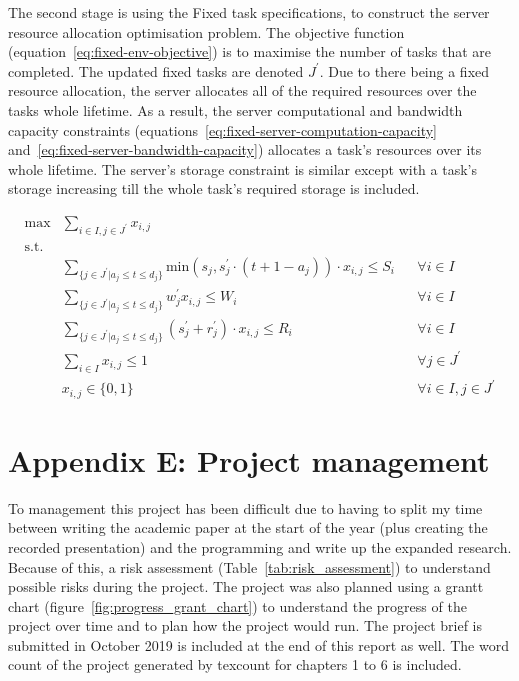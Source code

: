 The second stage is using the Fixed task specifications, to construct the server resource allocation optimisation
problem. The objective function (equation~\ref{eq:fixed-env-objective}) is to maximise the number of tasks that are
completed. The updated fixed tasks are denoted $J^{'}$. Due to there being a fixed resource allocation, the server
allocates all of the required resources over the tasks whole lifetime. As a result, the server computational and
bandwidth capacity constraints (equations~\ref{eq:fixed-server-computation-capacity}
and~\ref{eq:fixed-server-bandwidth-capacity}) allocates a task's resources over its whole lifetime. The server's storage
constraint is similar except with a task's storage increasing till the whole task's required storage is included.

\begin{align}
    \text{max} & \sum_{i \in I, j \in J^{'}} x_{i,j} \label{eq:fixed-env-objective} \\
    \mbox{s.t.} \nonumber \\
    & \sum_{\{j \in J^{'} | a_j \leq t \leq d_j\}} \text{min}(s_j, s^{'}_j \cdot (t + 1 - a_j)) \cdot x_{i,j} \leq S_i && \forall{i \in I} \label{eq:fixed-server-storage-capacity} \\
    & \sum_{\{j \in J^{'} | a_j \leq t \leq d_j\}} w^{'}_j x_{i,j} \leq W_i && \forall{i \in I} \label{eq:fixed-server-computation-capacity} \\
    & \sum_{\{j \in J^{'} | a_j \leq t \leq d_j\}} (s^{'}_j + r^{'}_j) \cdot x_{i,j} \leq R_i && \forall{i \in I} \label{eq:fixed-server-bandwidth-capacity} \\
    & \sum_{i \in I} x_{i,j} \leq 1 && \forall{j \in J^{'}} \label{eq:fixed-env-allocation-limit} \\
    & x_{i,j} \in \{0, 1\} && \forall{i \in I, j \in J^{'}} \label{eq:fixed-env-allocation-set}
\end{align}

\section*{Appendix E: Project management} \label{app:project-management}
To management this project has been difficult due to having to split my time between writing the academic paper at the
start of the year (plus creating the recorded presentation) and the programming and write up the expanded research.
Because of this, a risk assessment (Table~\ref{tab:risk_assessment}) to understand possible risks during the project.
The project was also planned using a grantt chart (figure~\ref{fig:progress_grant_chart}) to understand the progress of
the project over time and to plan how the project would run. The project brief is submitted in October 2019
is included at the end of this report as well. The word count of the project generated by texcount for chapters 1 to 6
is included.

